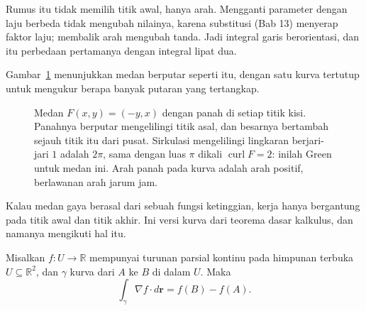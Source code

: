 Rumus itu tidak memilih titik awal, hanya arah. Mengganti parameter dengan
laju berbeda tidak mengubah nilainya, karena substitusi (Bab 13) menyerap
faktor laju; membalik arah mengubah tanda. Jadi integral garis berorientasi,
dan itu perbedaan pertamanya dengan integral lipat dua.

Gambar~\ref{fig:sirkulasi} menunjukkan medan berputar seperti itu, dengan satu
kurva tertutup untuk mengukur berapa banyak putaran yang tertangkap.

\begin{figure}[htbp]
\centering
{}
\caption{Medan $F(x,y)=(-y,x)$ dengan panah di setiap titik kisi. Panahnya berputar
mengelilingi titik asal, dan besarnya bertambah sejauh titik itu dari pusat. Sirkulasi
mengelilingi lingkaran berjari-jari $1$ adalah $2\pi$, sama dengan luas $\pi$ dikali
$\operatorname{curl}F=2$: inilah Green untuk medan ini. Arah panah pada kurva adalah arah
positif, berlawanan arah jarum jam.}
\label{fig:sirkulasi}
\end{figure}

Kalau medan gaya berasal dari sebuah fungsi ketinggian, kerja hanya bergantung
pada titik awal dan titik akhir. Ini versi kurva dari teorema dasar kalkulus,
dan namanya mengikuti hal itu.

\begin{teorema}
 Misalkan $f\colon U\to\mathbb{R}$ mempunyai turunan
parsial kontinu pada himpunan terbuka $U\subseteq\mathbb{R}^{2}$, dan $\gamma$
kurva dari $A$ ke $B$ di dalam $U$. Maka
\[
\int_{\gamma}\nabla f\cdot d\mathbf{r}=f(B)-f(A).
\]
\end{teorema}

